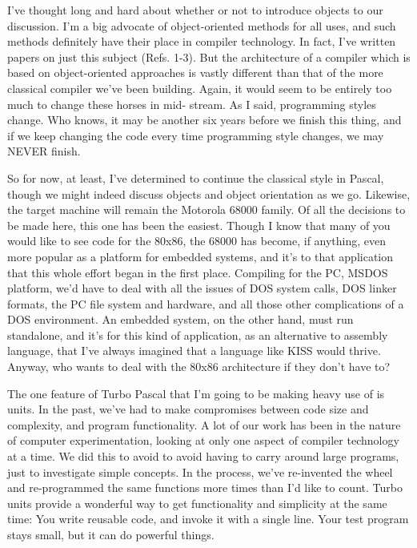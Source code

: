 \documentclass[float=false, crop=false]{standalone}
\begin{document}
I've thought long and hard about whether or not to introduce objects to our
discussion. I'm a big advocate of object-oriented methods for all uses, and such
methods definitely have their place in compiler technology. In fact, I've
written papers on just this subject (Refs. 1-3). But the architecture of a
compiler which is based on object-oriented approaches is vastly different than
that of the more classical compiler we've been building. Again, it would seem to
be entirely too much to change these horses in mid- stream. As I said,
programming styles change. Who knows, it may be another six years before we
finish this thing, and if we keep changing the code every time programming style
changes, we may NEVER finish.

So for now, at least, I've determined to continue the classical style in Pascal,
though we might indeed discuss objects and object orientation as we go.
Likewise, the target machine will remain the Motorola 68000 family. Of all the
decisions to be made here, this one has been the easiest. Though I know that
many of you would like to see code for the 80x86, the 68000 has become, if
anything, even more popular as a platform for embedded systems, and it's to that
application that this whole effort began in the first place. Compiling for the
PC, MSDOS platform, we'd have to deal with all the issues of DOS system calls,
DOS linker formats, the PC file system and hardware, and all those other
complications of a DOS environment. An embedded system, on the other hand, must
run standalone, and it's for this kind of application, as an alternative to
assembly language, that I've always imagined that a language like KISS would
thrive. Anyway, who wants to deal with the 80x86 architecture if they don't have
to?

The one feature of Turbo Pascal that I'm going to be making heavy use of is
units. In the past, we've had to make compromises between code size and
complexity, and program functionality. A lot of our work has been in the nature
of computer experimentation, looking at only one aspect of compiler technology
at a time. We did this to avoid to avoid having to carry around large programs,
just to investigate simple concepts. In the process, we've re-invented the wheel
and re-programmed the same functions more times than I'd like to count. Turbo
units provide a wonderful way to get functionality and simplicity at the same
time: You write reusable code, and invoke it with a single line. Your test
program stays small, but it can do powerful things.
\end{document}
